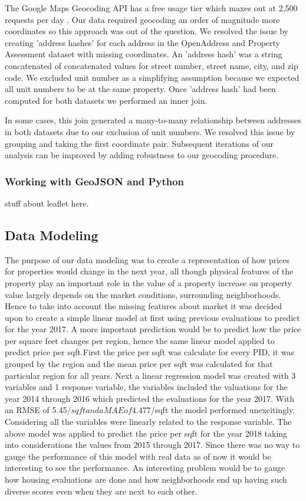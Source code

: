 \documentclass[12pt]{article}
\begin{document}
The Google Maps Geocoding API has a free usage tier which maxes out at
2,500 requests per day \cite{GettingS89:online}. Our data required
geocoding an order of magnitude more coordinates so this approach was
out of the question. We resolved the issue by creating 'address hashes'
for each address in the OpenAddress and Property Assessment dataset
with missing coordinates. An 'address hash' was a string concatenated
of concatenated values for street number, street name, city, and zip
code. We excluded unit number as a simplifying assumption because we
expected all unit numbers to be at the same property. Once 'address
hash' had been computed for both datasets we performed an inner join.

In some cases, this join generated a many-to-many relationship between
addresses in both datasets due to our exclusion of unit numbers. We
resolved this issue by grouping and taking the first coordinate pair.
Subsequent iterations of our analysis can be improved by adding
robustness to our geocoding procedure.

\subsubsection{Working with GeoJSON and Python}

stuff about leaflet here.

\subsection{Data Modeling}
The purpose of our data modeling was to create a representation of how
prices for properties would change in the next year, all though physical
features of the property play an important role in the value of a property
increase on property value largely depends on the market conditions, surrounding
neighborhoods. Hence to take into account the missing features about market 
it was decided upon to create a simple linear model at first using previous evaluations
to predict for the year 2017. A more important prediction would be to predict how the price
per square feet changes per region, hence the same linear model applied to predict
price per sqft.First the price per sqft was calculate for every PID, it was grouped by
the region and the mean price per sqft was calculated for that particular region for all years. Next a linear regression model was created with 3 variables and 1 response variable, the variables included the valuations for the year 2014 through 2016 which predicted the evaluations for the year 2017. With an RMSE of 5.45$/sqft and a MAE of 4.477$/sqft the model performed unexcitingly. Considering all the variables were linearly related to the response variable. The above model was applied to predict the price per sqft for the year 2018 taking into considerations the values from 2015 through 2017. Since there was no way to gauge the performance of this model with real data as of now it would be interesting to see the performance.
An interesting problem would be to gauge how housing evaluations are done and how neighborhoods 
end up having such diverse scores even when they are next to each other.
\end{document}
